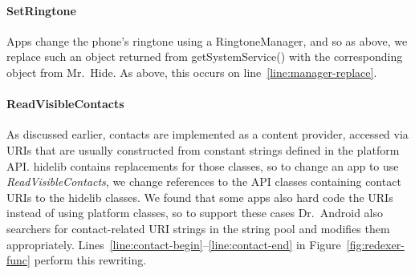 \documentclass[preprint]{sig-alternate-10pt}
\newcommand{\code}[1]{\textsf{#1}}
\newcommand{\lib}{Mr.\ Hide\xspace}
\newcommand{\rewriter}{Dr.\ Android\xspace}
\newcommand{\perm}[1]{\textsf{\textit{#1}}}
\newcommand{\comment}[3][\color{red}]{}%
\newcommand{\jeff}[1]{\comment[\color{green}]{JSF}{#1}}
\begin{document}
\paragraph*{SetRingtone}

Apps change the phone's ringtone using a \code{RingtoneManager}, and
so as above, we replace such an object returned from
\code{getSystemService()} with the corresponding object from \lib. As
above, this occurs on line~\ref{line:manager-replace}.

\paragraph*{ReadVisibleContacts}
As discussed earlier, contacts are implemented as a content provider,
accessed via URIs that are usually constructed from constant strings
defined in the platform API. \code{hidelib} contains replacements for
those classes, so to change an app to use \perm{ReadVisibleContacts},
we change references to the API classes containing contact URIs to the
\code{hidelib} classes. We found that some apps also hard code the URIs
instead of using platform classes, so to support these cases \rewriter
also searchers for contact-related URI strings in the string pool and
modifies them
appropriately. Lines~\ref{line:contact-begin}--\ref{line:contact-end}
in Figure~\ref{fig:redexer-func} perform this rewriting.



\end{document}
